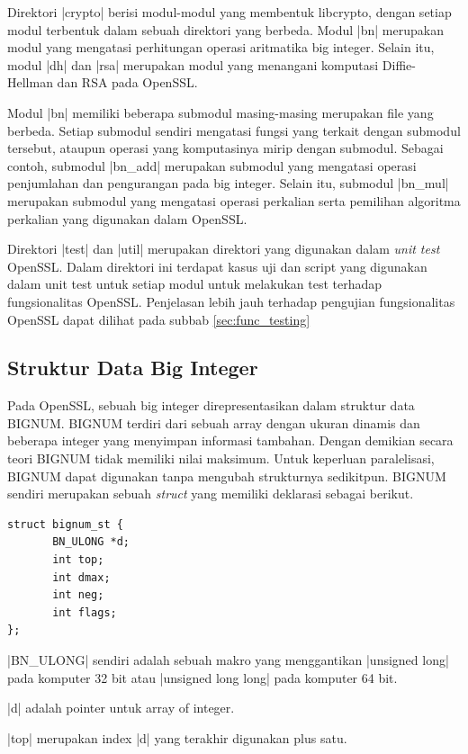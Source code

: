 Direktori |crypto| berisi modul-modul yang membentuk libcrypto, dengan setiap modul terbentuk dalam sebuah direktori yang berbeda. Modul |bn| merupakan modul yang mengatasi perhitungan operasi aritmatika big integer. Selain itu, modul |dh| dan |rsa| merupakan modul yang menangani komputasi Diffie-Hellman dan RSA pada OpenSSL.

Modul |bn| memiliki beberapa submodul masing-masing merupakan file yang berbeda. Setiap submodul sendiri mengatasi fungsi yang terkait dengan submodul tersebut, ataupun operasi yang komputasinya mirip dengan submodul. Sebagai contoh, submodul |bn_add| merupakan submodul yang mengatasi operasi penjumlahan dan pengurangan pada big integer. Selain itu, submodul |bn_mul| merupakan submodul yang mengatasi operasi perkalian serta pemilihan algoritma perkalian yang digunakan dalam OpenSSL.

Direktori |test| dan |util| merupakan direktori yang digunakan dalam \textit{unit test} OpenSSL. Dalam direktori ini terdapat kasus uji dan script yang digunakan dalam unit test untuk setiap modul untuk melakukan test terhadap fungsionalitas OpenSSL. Penjelasan lebih jauh terhadap pengujian fungsionalitas OpenSSL dapat dilihat pada subbab \ref{sec:func_testing}

\subsection{Struktur Data Big Integer} \label{sec:bignum_struct}
Pada OpenSSL, sebuah big integer direpresentasikan dalam struktur data BIGNUM. BIGNUM terdiri dari sebuah array dengan ukuran dinamis dan beberapa integer yang menyimpan informasi tambahan. Dengan demikian secara teori BIGNUM tidak memiliki nilai maksimum. Untuk keperluan paralelisasi, BIGNUM dapat digunakan tanpa mengubah strukturnya sedikitpun. BIGNUM sendiri merupakan sebuah \textit{struct} yang memiliki deklarasi sebagai berikut.

\begin{lstlisting}[caption=Struktur Data bignum]
struct bignum_st {
       BN_ULONG *d;
       int top;
       int dmax;
       int neg;
       int flags;
};
\end{lstlisting}

|BN_ULONG| sendiri adalah sebuah makro yang menggantikan |unsigned long| pada komputer 32 bit atau |unsigned long long| pada komputer 64 bit.

|d| adalah pointer untuk array of integer.

|top| merupakan index |d| yang terakhir digunakan plus satu.

